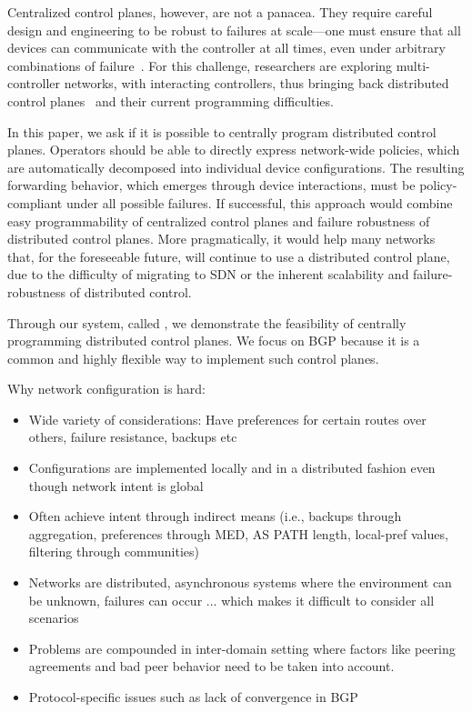 Centralized control planes, however, are not a panacea. 
They require careful design and engineering to be robust to failures at scale---one must ensure that all devices can communicate with the controller at all times, even under arbitrary combinations of failure~\cite{x,y,z}. For this challenge, researchers are exploring multi-controller networks, with interacting controllers, thus bringing back distributed control planes~\cite{x,y,z} and their current programming difficulties.

In this paper, we ask if it is possible to centrally program distributed control planes.
Operators should be able to directly express network-wide policies, which are automatically decomposed into individual device configurations. The resulting forwarding behavior, which emerges through device interactions, must be policy-compliant under all possible failures.
If successful, this approach would combine easy programmability of centralized control planes and failure robustness of distributed control planes. 
%
More pragmatically, it would help many networks that, for the foreseeable future, will continue to use a distributed control plane, due to the difficulty of migrating to SDN or the inherent scalability and failure-robustness of distributed control.


Through our system, called \sysname, we demonstrate the feasibility of centrally programming distributed control planes. We focus on BGP because it is a common and highly flexible way to implement such control planes.



Why network configuration is hard:
\begin{itemize}
	\item Wide variety of considerations: Have preferences for certain routes over others, failure resistance, backups etc
	\item Configurations are implemented locally and in a distributed fashion even though network intent is global
	\item Often achieve intent through indirect means (i.e., backups through aggregation, preferences through MED, AS PATH length, local-pref values, filtering through communities)
	\item Networks are distributed, asynchronous systems where the environment can be unknown, failures can occur ... which makes it difficult to consider all scenarios
	\item Problems are compounded in inter-domain setting where factors like peering agreements and bad peer behavior need to be taken into account.
	\item Protocol-specific issues such as lack of convergence in BGP
\end{itemize}

